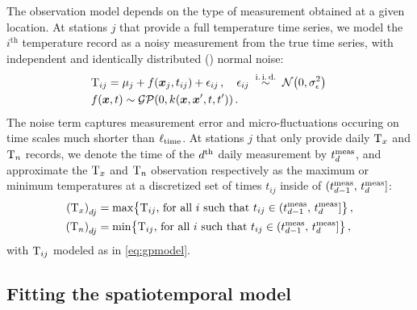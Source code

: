The observation model depends on the type of measurement obtained at a given location.
At stations \(j\) that provide a full temperature time series, we model the \(i^{\mathrm{th}}\) temperature record as a noisy measurement from the true time series, with independent and identically distributed (\iid{}) normal noise:
\begin{equation}
\begin{split}
    & \Temp_{ij} = \mu_{j} + f(\xvec_j, t_{ij}) + \epsilon_{ij}\,,\quad
    \epsilon_{ij} \overset{\mathiid}{\sim} \normal\del{0,\sigman^2}\,\\
    & f(\xvec, t) \sim \GP\del{0, k_{}(\xvec,\xvec',t,t')}\,.\\
\end{split}
\label{eq:gpmodel}
\end{equation}
The noise term captures measurement error and micro-fluctuations occuring on time scales much shorter than \(\ell_{\mathrm{time}}\).
At stations \(j\) that only provide daily \(\mathrm{T}_{x}\) and \(\mathrm{T}_{n}\) records, 
we denote the time of the \(d^{\mathrm{th}}\) daily measurement by \(t^{\mathrm{meas}}_{d}\), 
and approximate the \(\mathrm{T}_{x}\) and \(\mathrm{T}_{n}\) observation respectively as the maximum or minimum temperatures at a discretized set of times \(t_{ij}\) inside of \((t^{\mathrm{meas}}_{d-1},\,t^{\mathrm{meas}}_{d}]\):
\begin{equation}
\begin{split}
    \del{\Tx}_{\iday j} &= \max\cbr{\Temp_{ij}\text{, for all \(i\) such that } t_{ij} \in \dayset{\iday}} \,,\\
    \del{\Tn}_{\iday j} &= \min\cbr{\Temp_{ij}\text{, for all \(i\) such that } t_{ij} \in \dayset{\iday}} \,,
\end{split}
\label{eq:obs_Tn_Tx}
\end{equation}
with \(\mathrm{T}_{ij}\) modeled as in \autoref{eq:gpmodel}.

\subsection{Fitting the spatiotemporal model}
\label{sec:hyperparameters}

